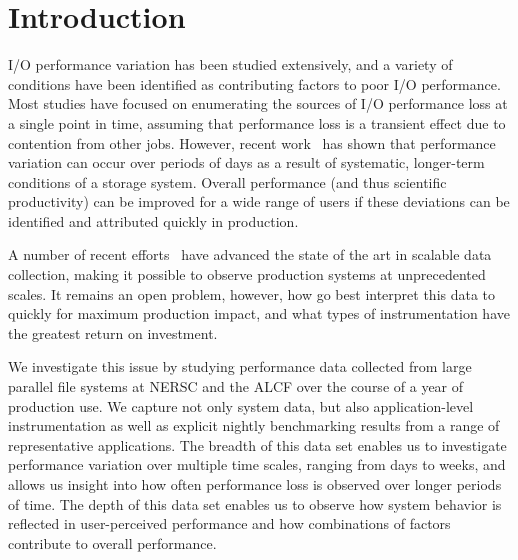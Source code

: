 \section{Introduction}

I/O performance variation has been studied extensively, and a variety of conditions have been identified as contributing factors to poor I/O performance.  Most studies have focused on enumerating the sources of I/O performance loss at a single point in time, assuming that performance loss is a transient effect due to contention from other jobs.  However, recent work~\cite{Lockwood2017} has shown that performance variation can occur over periods of days as a result of systematic, longer-term conditions of a storage system.
%
Overall performance (and thus scientific productivity) can be improved for a
wide range of users if these deviations can be identified and attributed
quickly in production.


A number of recent efforts~\cite{Lockwood2017,Vazhkudai2017guide,Agelastos2014ldms,Kunkel2014siox} have advanced the
state of the art in scalable data collection, making it possible to observe
production systems at unprecedented scales.  It remains an open problem,
however, how go best interpret this data to quickly for maximum production
impact, and what types of instrumentation have the greatest return on
investment.

We investigate this issue by studying performance data collected from
large parallel file systems at NERSC and the ALCF over the course of
a year of production use.  We capture not only system data, but also
application-level instrumentation as well as explicit nightly benchmarking
results from a range of representative applications.  The breadth of
this data set enables us to investigate performance variation over
multiple time scales, ranging from days to weeks, and allows us insight
into how often performance loss is observed over longer periods of time.
The depth of this data set enables us to observe how system behavior is
reflected in user-perceived performance and how combinations of factors
contribute to overall performance.

